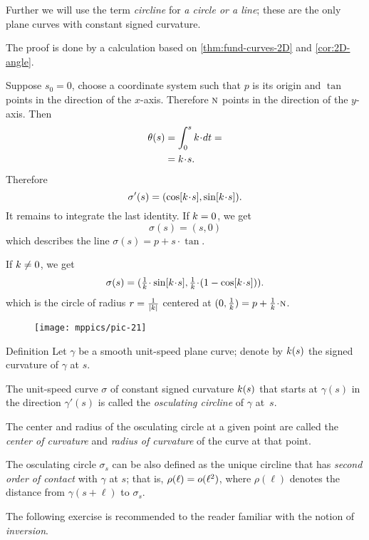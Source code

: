 Further we will use the term \emph{circline} for {}\emph{a circle or a line};
these are the only plane curves with constant signed curvature.

The proof is done by a calculation based on \ref{thm:fund-curves-2D} and \ref{cor:2D-angle}.

Suppose $s_0=0$, choose a coordinate system such that $p$ is its origin and $\tan$ points in the direction of the $x$-axis. Therefore $\text{\sc{n}}$ points in the direction of the $y$-axis.
Then
\begin{align*}\theta(s)&=\int_{0}^s\skur\cdot dt=
\\
&=\skur\cdot s.
\end{align*}
Therefore
\[\sigma'(s)=(\cos[\skur\cdot s],\sin[\skur\cdot s]).\]
It remains to integrate the last identity.
If $k=0$, we get 
\[\sigma(s)=(s,0)\]
which describes the line $\sigma(s)=p+s\cdot \tan$.

If $k\ne 0$, we get
\[\sigma(s)=(\tfrac1\skur\cdot\sin[\skur\cdot s],
\tfrac1\skur\cdot(1-\cos[\skur\cdot s])).\]
which is the circle of radius $r=\tfrac1{|k|}$ centered at $(0,\tfrac1\skur)=p+\tfrac1\skur\cdot\norm$.
\qeds


\begin{wrapfigure}{r}{31 mm}
\vskip-0mm
\centering
\texttt{[image: mppics/pic-21]}
\vskip0mm
\end{wrapfigure}

\begin{thm}{Definition}
Let $\gamma$ be a smooth unit-speed plane curve;
denote by $k(s)$ the signed curvature of $\gamma$ at $s$.

The unit-speed curve $\sigma$ of constant signed curvature $k(s)$ that starts at $\gamma(s)$ in the direction $\gamma'(s)$ is called the \emph{osculating circline} of $\gamma$ at~$s$.

The center and radius of the osculating circle at a given point are called the \emph{center of curvature} and \emph{radius of curvature} of the curve at that point.
\end{thm}

The osculating circle $\sigma_s$ can be also defined as the unique circline that has \emph{second order of contact} with $\gamma$ at $s$;
that is, $\rho(\ell)\z=o(\ell^2)$, where $\rho(\ell)$ denotes the distance from $\gamma(s+\ell)$ to $\sigma_s$.

The following exercise is recommended to the reader familiar with the notion of \emph{inversion}.

